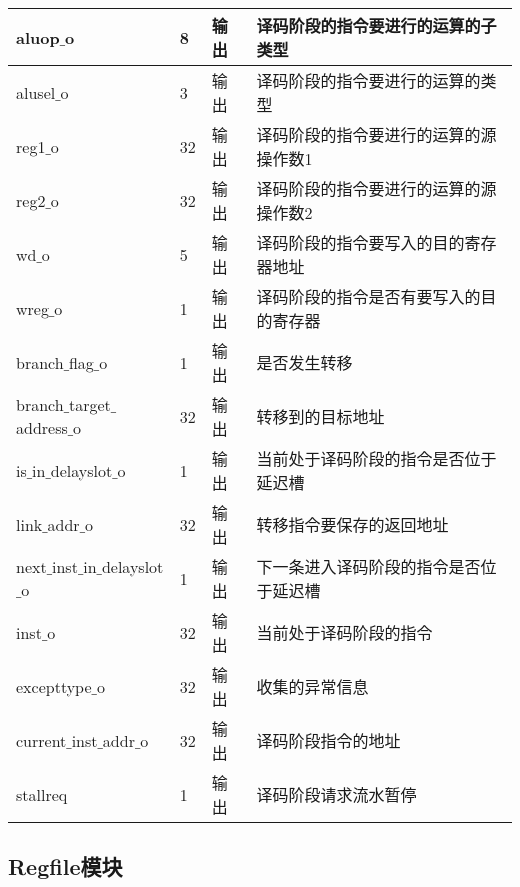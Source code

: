 \begin{table}[H]
\begin{tabular}{|l|l|l|l|}
		\hline
		aluop$\_$o & 8 & 输出 & 译码阶段的指令要进行的运算的子类型 \\
		\hline
		alusel$\_$o & 3 & 输出 & 译码阶段的指令要进行的运算的类型 \\
		\hline
		reg1$\_$o & 32 & 输出 & 译码阶段的指令要进行的运算的源操作数1 \\
		\hline
		reg2$\_$o & 32 & 输出 & 译码阶段的指令要进行的运算的源操作数2 \\
		\hline
		wd$\_$o & 5 & 输出 & 译码阶段的指令要写入的目的寄存器地址 \\
		\hline
		wreg$\_$o & 1 & 输出 & 译码阶段的指令是否有要写入的目的寄存器 \\
		\hline
		branch$\_$flag$\_$o & 1 & 输出 & 是否发生转移 \\
		\hline
		branch$\_$target$\_$address$\_$o & 32 & 输出 & 转移到的目标地址 \\
		\hline
		is$\_$in$\_$delayslot$\_$o & 1 & 输出 & 当前处于译码阶段的指令是否位于延迟槽 \\
		\hline
		link$\_$addr$\_$o & 32 & 输出 & 转移指令要保存的返回地址 \\
		\hline
		next$\_$inst$\_$in$\_$delayslot$\_$o & 1 & 输出 & 下一条进入译码阶段的指令是否位于延迟槽 \\
		\hline
		inst$\_$o & 32 & 输出 & 当前处于译码阶段的指令 \\
		\hline
		excepttype$\_$o & 32 & 输出 & 收集的异常信息 \\
		\hline
		current$\_$inst$\_$addr$\_$o & 32 & 输出 & 译码阶段指令的地址 \\
		\hline
		stallreq & 1 & 输出 & 译码阶段请求流水暂停 \\
		\hline
	\end{tabular}
\end{table}
\subsection{Regfile模块}
